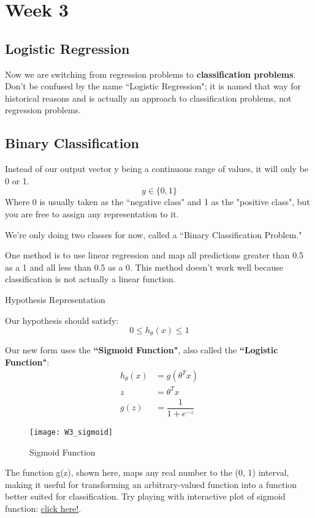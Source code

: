 \chapter{Week 3}
\section{Logistic Regression}
Now we are switching from regression problems to {\bf classification problems}. Don't be confused by the name ``Logistic Regression"; it is named that way for historical reasons and is actually an approach to classification problems, not regression problems.
\section{Binary Classification}
Instead of our output vector y being a continuous range of values, it will only be 0 or 1.
\[y \in \{0,1\} \]
Where 0 is usually taken as the ``negative class" and 1 as the "positive class", but you are free to assign any representation to it.

We're only doing two classes for now, called a ``Binary Classification Problem."

One method is to use linear regression and map all predictions greater than 0.5 as a 1 and all less than 0.5 as a 0. This method doesn't work well because classification is not actually a linear function.

Hypothesis Representation

Our hypothesis should satisfy:
\[0 \leq h_\theta (x) \leq 1 \]

Our new form uses the {\bf ``Sigmoid Function"}, also called the {\bf ``Logistic Function"}:
\begin{align}
h_\theta (x) &=  g ( \theta^T x ) \\
z &= \theta^T x \\
g(z) &= \dfrac{1}{1 + e^{-z}}
\end{align}

\begin{figure}[ht]
\center
\texttt{[image: W3\_sigmoid]}
\caption{Sigmoid Function}
\label{fig:W3_sigmoid}
\end{figure}

The function g(z), shown here, maps any real number to the (0, 1) interval, making it useful for transforming an arbitrary-valued function into a function better suited for classification. Try playing with interactive plot of sigmoid function: \href{https://www.desmos.com/calculator/bgontvxotm}{click here!}.

